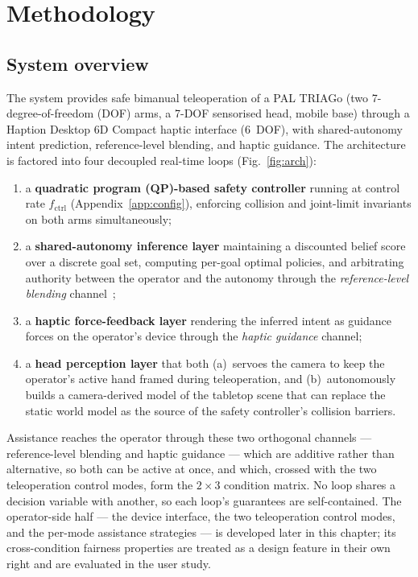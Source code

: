 \chapter{Methodology}
\label{ch:method}

\section{System overview}
\label{sec:overview}

The system provides safe bimanual teleoperation of a PAL TRIAGo (two 7-degree-of-freedom (DOF) arms, a 7-DOF sensorised head, mobile base) through a Haption Desktop 6D Compact haptic interface (6~DOF), with shared-autonomy intent prediction, reference-level blending, and haptic guidance.
The architecture is factored into four decoupled real-time loops (Fig.~\ref{fig:arch}):
\begin{enumerate}[nosep]
\item a \textbf{quadratic program (QP)-based safety controller} running at control rate $f_{\text{ctrl}}$ (Appendix~\ref{app:config}), enforcing collision and joint-limit invariants on both arms simultaneously;
\item a \textbf{shared-autonomy inference layer} maintaining a discounted belief score over a discrete goal set, computing per-goal optimal policies, and arbitrating authority between the operator and the autonomy through the \emph{reference-level blending} channel~\cite{dragan2013policy,javdani2018hindsight,losey2018review};
\item a \textbf{haptic force-feedback layer} rendering the inferred intent as guidance forces on the operator's device through the \emph{haptic guidance} channel;
\item a \textbf{head perception layer} that both (a)~servoes the camera to keep the operator's active hand framed during teleoperation, and (b)~autonomously builds a camera-derived model of the tabletop scene that can replace the static world model as the source of the safety controller's collision barriers.
\end{enumerate}
Assistance reaches the operator through these two orthogonal channels --- reference-level blending and haptic guidance --- which are additive rather than alternative, so both can be active at once, and which, crossed with the two teleoperation control modes, form the $2\times3$ condition matrix. No loop shares a decision variable with another, so each loop's guarantees are self-contained. The operator-side half --- the device interface, the two teleoperation control modes, and the per-mode assistance strategies --- is developed later in this chapter; its cross-condition fairness properties are treated as a design feature in their own right and are evaluated in the user study.

